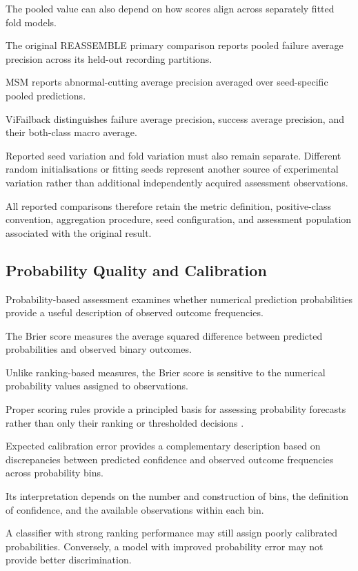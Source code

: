 The pooled value can also depend on how scores align across separately fitted fold models.

The original REASSEMBLE primary comparison reports pooled failure average precision across its held-out recording partitions.

MSM reports abnormal-cutting average precision averaged over seed-specific pooled predictions.

ViFailback distinguishes failure average precision, success average precision, and their both-class macro average.

Reported seed variation and fold variation must also remain separate. Different random initialisations or fitting seeds represent another source of experimental variation rather than additional independently acquired assessment observations.

All reported comparisons therefore retain the metric definition, positive-class convention, aggregation procedure, seed configuration, and assessment population associated with the original result.

\subsection{Probability Quality and Calibration}

Probability-based assessment examines whether numerical prediction probabilities provide a useful description of observed outcome frequencies.

The Brier score measures the average squared difference between predicted probabilities and observed binary outcomes.

Unlike ranking-based measures, the Brier score is sensitive to the numerical probability values assigned to observations.

Proper scoring rules provide a principled basis for assessing probability forecasts rather than only their ranking or thresholded decisions \parencite{P055}.

Expected calibration error provides a complementary description based on discrepancies between predicted confidence and observed outcome frequencies across probability bins.

Its interpretation depends on the number and construction of bins, the definition of confidence, and the available observations within each bin.

A classifier with strong ranking performance may still assign poorly calibrated probabilities. Conversely, a model with improved probability error may not provide better discrimination.

